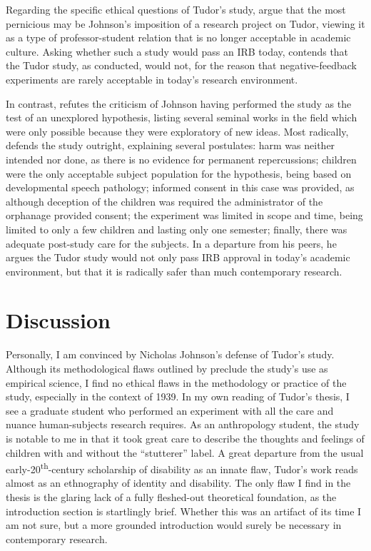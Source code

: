 \documentclass[american]{../../../coursework}
\begin{document}
Regarding the specific ethical questions of Tudor's study,
\textcite{GoldfarbEthics05} argue that the most pernicious may be
Johnson's imposition of a research project on Tudor, viewing it as a
type of professor-student relation that is no longer acceptable in
academic culture. Asking whether such a study would pass an IRB today,
\textcite{GoldfarbEthics06} contends that the Tudor study, as conducted, would not,
for the reason that negative-feedback experiments are rarely acceptable
in today's research environment.

In contrast, \textcite{GoldfarbEthics07} refutes the criticism of Johnson having
performed the study as the test of an unexplored hypothesis, listing
several seminal works in the field which were only possible because they
were exploratory of new ideas. Most radically, \textcite{GoldfarbEthics09}
defends the study outright, explaining several postulates: harm was
neither intended nor done, as there is no evidence for permanent
repercussions; children were the only acceptable subject population for
the hypothesis, being based on developmental speech pathology; informed
consent in this case was provided, as although deception of the children
was required the administrator of the orphanage provided consent; the
experiment was limited in scope and time, being limited to only a few
children and lasting only one semester; finally, there was adequate
post-study care for the subjects. In a departure from his peers, he
argues the Tudor study would not only pass IRB approval in today's
academic environment, but that it is radically safer than much
contemporary research.

\section{Discussion}

Personally, I am convinced by Nicholas Johnson's defense of Tudor's
study. Although its methodological flaws outlined by \textcite{Amb02}
preclude the study's use as empirical science, I find no ethical
flaws in the methodology or practice of the study, especially in the
context of 1939. In my own reading of Tudor's thesis, I see a graduate
student who performed an experiment with all the care and nuance
human-subjects research requires. As an anthropology student, the study
is notable to me in that it took great care to describe the thoughts and
feelings of children with and without the ``stutterer'' label. A great
departure from the usual early-20\textsuperscript{th}-century
scholarship of disability as an innate flaw, Tudor's work reads almost
as an ethnography of identity and disability. The only flaw I find in
the thesis is the glaring lack of a fully fleshed-out theoretical
foundation, as the introduction section is startlingly brief. Whether
this was an artifact of its time I am not sure, but a more grounded
introduction would surely be necessary in contemporary research.
\end{document}
